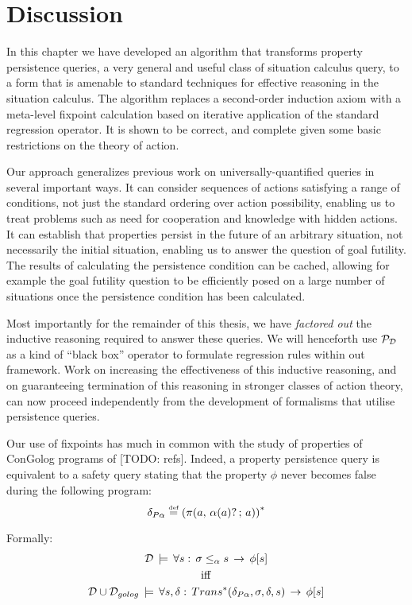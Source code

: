 \section{Discussion\label{sec:Persistence:Discussion}}

In this chapter we have developed an algorithm that transforms property
persistence queries, a very general and useful class of situation
calculus query, to a form that is amenable to standard techniques
for effective reasoning in the situation calculus. The algorithm replaces
a second-order induction axiom with a meta-level fixpoint calculation
based on iterative application of the standard regression operator.
It is shown to be correct, and complete given some basic restrictions
on the theory of action.

Our approach generalizes previous work on universally-quantified queries
in several important ways. It can consider sequences of actions satisfying
a range of conditions, not just the standard ordering over action
possibility, enabling us to treat problems such as need for cooperation
and knowledge with hidden actions. It can establish that properties
persist in the future of an arbitrary situation, not necessarily the
initial situation, enabling us to answer the question of goal futility.
The results of calculating the persistence condition can be cached,
allowing for example the goal futility question to be efficiently
posed on a large number of situations once the persistence condition
has been calculated.

Most importantly for the remainder of this thesis, we have \emph{factored
out} the inductive reasoning required to answer these queries. We
will henceforth use $\mathcal{P}_{\mathcal{D}}$ as a kind of {}``black box'' operator
to formulate regression rules within out framework. Work on increasing
the effectiveness of this inductive reasoning, and on guaranteeing
termination of this reasoning in stronger classes of action theory,
can now proceed independently from the development of formalisms that
utilise persistence queries.

Our use of fixpoints has much in common with the study of properties
of ConGolog programs of {[}TODO: refs]. Indeed, a property persistence
query is equivalent to a safety query stating that the property $\phi$
never becomes false during the following program:\[
\delta_{P\alpha}\stackrel{\mbox{\tiny def}}{=}\left(\pi(a,\,\alpha(a)?\,;\, a)\right)^{*}\]


Formally:\begin{gather*}
\mathcal{D}\,\models\,\forall s:\,\sigma\leq_{\alpha}s\,\rightarrow\,\phi[s]\\
\mathrm{iff}\\
\mathcal{D}\cup\mathcal{D}_{golog}\,\models\,\forall s,\delta:\, Trans^{*}(\delta_{P\alpha},\sigma,\delta,s)\,\rightarrow\,\phi[s]\end{gather*}



